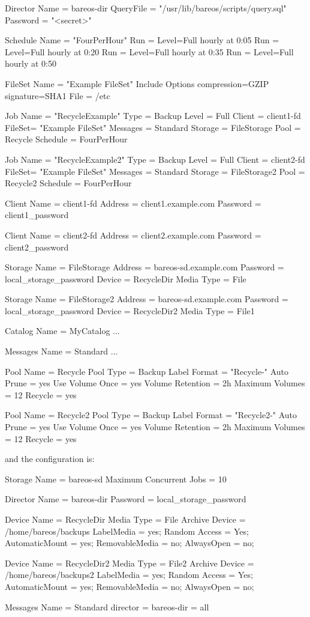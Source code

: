 \begin{bconfig}{}
Director {
  Name = bareos-dir
  QueryFile = "/usr/lib/bareos/scripts/query.sql"
  Password = "<secret>"
}

Schedule {
  Name = "FourPerHour"
  Run = Level=Full hourly at 0:05
  Run = Level=Full hourly at 0:20
  Run = Level=Full hourly at 0:35
  Run = Level=Full hourly at 0:50
}

FileSet {
  Name = "Example FileSet"
  Include {
    Options {
      compression=GZIP
      signature=SHA1
    }
    File = /etc
  }
}

Job {
  Name = "RecycleExample"
  Type = Backup
  Level = Full
  Client = client1-fd
  FileSet= "Example FileSet"
  Messages = Standard
  Storage = FileStorage
  Pool = Recycle
  Schedule = FourPerHour
}

Job {
  Name = "RecycleExample2"
  Type = Backup
  Level = Full
  Client = client2-fd
  FileSet= "Example FileSet"
  Messages = Standard
  Storage = FileStorage2
  Pool = Recycle2
  Schedule = FourPerHour
}

Client {
  Name = client1-fd
  Address = client1.example.com
  Password = client1_password
}

Client {
  Name = client2-fd
  Address = client2.example.com
  Password = client2_password
}

Storage {
  Name = FileStorage
  Address = bareos-sd.example.com
  Password = local_storage_password
  Device = RecycleDir
  Media Type = File
}

Storage {
  Name = FileStorage2
  Address = bareos-sd.example.com
  Password = local_storage_password
  Device = RecycleDir2
  Media Type = File1
}

Catalog {
  Name = MyCatalog
  ...
}

Messages {
  Name = Standard
  ...
}

Pool {
  Name = Recycle
  Pool Type = Backup
  Label Format = "Recycle-"
  Auto Prune = yes
  Use Volume Once = yes
  Volume Retention = 2h
  Maximum Volumes = 12
  Recycle = yes
}

Pool {
  Name = Recycle2
  Pool Type = Backup
  Label Format = "Recycle2-"
  Auto Prune = yes
  Use Volume Once = yes
  Volume Retention = 2h
  Maximum Volumes = 12
  Recycle = yes
}
\end{bconfig}

and the \bareosSd configuration is:

\begin{bconfig}{}
Storage {
  Name = bareos-sd
  Maximum Concurrent Jobs = 10
}

Director {
  Name = bareos-dir
  Password = local_storage_password
}

Device {
  Name = RecycleDir
  Media Type = File
  Archive Device = /home/bareos/backups
  LabelMedia = yes;
  Random Access = Yes;
  AutomaticMount = yes;
  RemovableMedia = no;
  AlwaysOpen = no;
}

Device {
  Name = RecycleDir2
  Media Type = File2
  Archive Device = /home/bareos/backups2
  LabelMedia = yes;
  Random Access = Yes;
  AutomaticMount = yes;
  RemovableMedia = no;
  AlwaysOpen = no;
}

Messages {
  Name = Standard
  director = bareos-dir = all
}
\end{bconfig}

